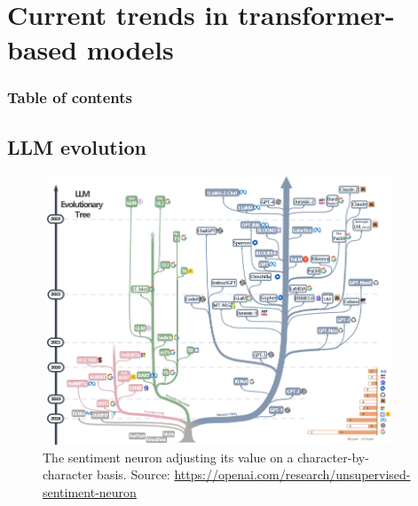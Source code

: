 \documentclass[9pt]{beamer}
\begin{document}

\section{Current trends in transformer-based models}
\begin{frame}
    \frametitle{Table of contents}
    \tableofcontents[currentsection]
\end{frame}


\subsection{LLM evolution}
\begin{frame}{}  %
    \begin{figure}
        \centering
        \includegraphics[width=10.5cm, height=8.0cm]{img/llm-evo-tree.png}
        \caption{The sentiment neuron adjusting its value on a character-by-character basis. Source: \url{https://openai.com/research/unsupervised-sentiment-neuron}}
        \label{fig:enter-label}
    \end{figure}
\end{frame}


\end{document}
